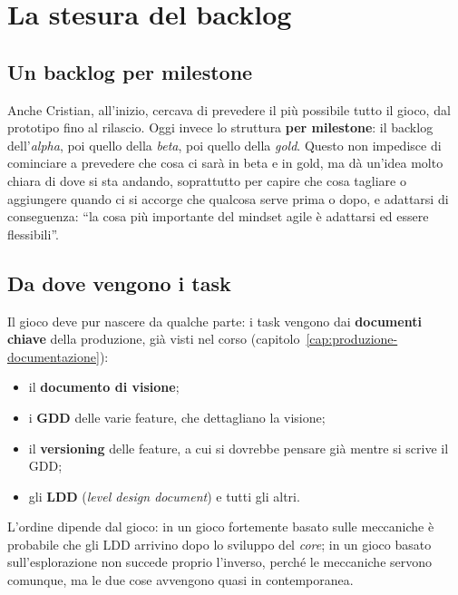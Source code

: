 \section{La stesura del backlog}
\label{sec:z3-backlog}

\subsection{Un backlog per milestone}

Anche Cristian, all'inizio, cercava di prevedere il più possibile tutto il
gioco, dal prototipo fino al rilascio. Oggi invece lo struttura
\textbf{per milestone}: il backlog dell'\emph{alpha}, poi quello della
\emph{beta}, poi quello della \emph{gold}. Questo non impedisce di cominciare
a prevedere che cosa ci sarà in beta e in gold, ma dà un'idea molto chiara di
dove si sta andando, soprattutto per capire che cosa tagliare o aggiungere
quando ci si accorge che qualcosa serve prima o dopo, e adattarsi di
conseguenza: ``la cosa più importante del mindset agile è adattarsi ed essere
flessibili''.

\subsection{Da dove vengono i task}

Il gioco deve pur nascere da qualche parte: i task vengono dai
\textbf{documenti chiave} della produzione, già visti nel corso
(capitolo~\ref{cap:produzione-documentazione}):
\begin{itemize}
  \item il \textbf{documento di visione};
  \item i \textbf{GDD} delle varie feature, che dettagliano la visione;
  \item il \textbf{versioning} delle feature, a cui si dovrebbe pensare già
        mentre si scrive il GDD;
  \item gli \textbf{LDD} (\emph{level design document}) e tutti gli altri.
\end{itemize}
L'ordine dipende dal gioco: in un gioco fortemente basato sulle meccaniche è
probabile che gli LDD arrivino dopo lo sviluppo del \emph{core}; in un gioco
basato sull'esplorazione non succede proprio l'inverso, perché le meccaniche
servono comunque, ma le due cose avvengono quasi in contemporanea.

